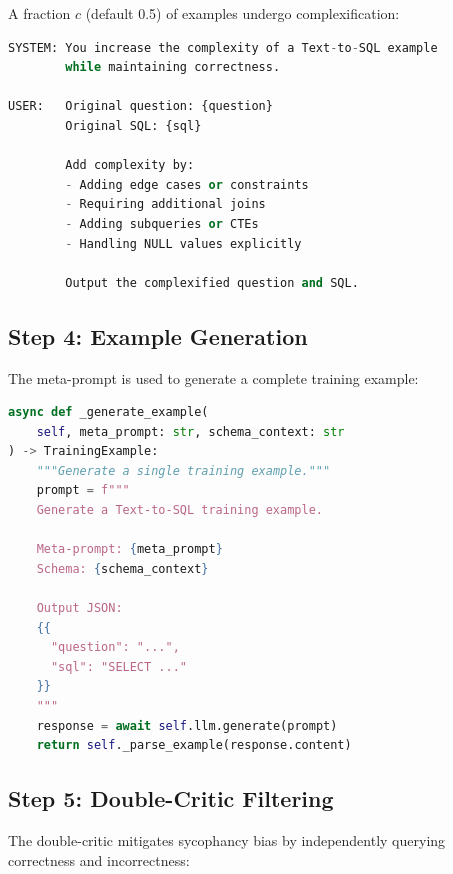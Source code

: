 \documentclass[11pt,a4paper]{article}
\begin{document}
A fraction $c$ (default 0.5) of examples undergo complexification:

\begin{lstlisting}[language=Python,caption={Complexification prompt}]
SYSTEM: You increase the complexity of a Text-to-SQL example
        while maintaining correctness.
        
USER:   Original question: {question}
        Original SQL: {sql}
        
        Add complexity by:
        - Adding edge cases or constraints
        - Requiring additional joins
        - Adding subqueries or CTEs
        - Handling NULL values explicitly
        
        Output the complexified question and SQL.
\end{lstlisting}

\subsection{Step 4: Example Generation}

The meta-prompt is used to generate a complete training example:

\begin{lstlisting}[language=Python,caption={Example generation}]
async def _generate_example(
    self, meta_prompt: str, schema_context: str
) -> TrainingExample:
    """Generate a single training example."""
    prompt = f"""
    Generate a Text-to-SQL training example.
    
    Meta-prompt: {meta_prompt}
    Schema: {schema_context}
    
    Output JSON:
    {{
      "question": "...",
      "sql": "SELECT ..."
    }}
    """
    response = await self.llm.generate(prompt)
    return self._parse_example(response.content)
\end{lstlisting}

\subsection{Step 5: Double-Critic Filtering}

The double-critic mitigates sycophancy bias by independently querying correctness
and incorrectness:
\end{document}
